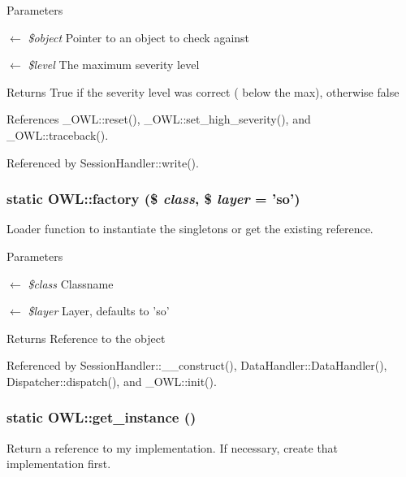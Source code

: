 \begin{DoxyParams}{Parameters}
\item[\mbox{$\leftarrow$} {\em \$object}]Pointer to an object to check against \item[\mbox{$\leftarrow$} {\em \$level}]The maximum severity level \end{DoxyParams}
\begin{DoxyReturn}{Returns}
True if the severity level was correct ( below the max), otherwise false 
\end{DoxyReturn}


References \_\-OWL::reset(), \_\-OWL::set\_\-high\_\-severity(), and \_\-OWL::traceback().



Referenced by SessionHandler::write().

\subsubsection[{factory}]{\setlength{\rightskip}{0pt plus 5cm}static OWL::factory (\$ {\em class}, \/  \$ {\em layer} = {\ttfamily 'so'})}\label{classOWL_aa6f4f99b9b0d6c77e7d49075d8a29d69}
Loader function to instantiate the singletons or get the existing reference. 
\begin{DoxyParams}{Parameters}
\item[\mbox{$\leftarrow$} {\em \$class}]Classname \item[\mbox{$\leftarrow$} {\em \$layer}]Layer, defaults to 'so' \end{DoxyParams}
\begin{DoxyReturn}{Returns}
Reference to the object 
\end{DoxyReturn}


Referenced by SessionHandler::\_\-\_\-construct(), DataHandler::DataHandler(), Dispatcher::dispatch(), and \_\-OWL::init().

\subsubsection[{get\_\-instance}]{\setlength{\rightskip}{0pt plus 5cm}static OWL::get\_\-instance ()}\label{classOWL_ae75b698b8f0aa7f9106ce84744ff10ed}
Return a reference to my implementation. If necessary, create that implementation first.

